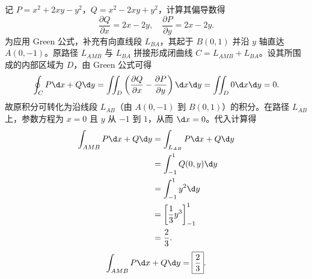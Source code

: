 \begin{solution}

    记 $P = x^2+2xy-y^2$，$Q = x^2-2xy+y^2$，计算其偏导数得
    \begin{equation}
        \frac{\partial Q}{\partial x} = 2x-2y, \quad \frac{\partial P}{\partial y} = 2x-2y.
    \end{equation}
    为应用 Green 公式，补充有向直线段 $L_{BA}$，其起于 $B(0,1)$ 并沿 $y$ 轴直达 $A(0,-1)$。原路径 $L_{AMB}$ 与 $L_{BA}$ 拼接形成闭曲线 $C = L_{AMB} + L_{BA}$。设其所围成的内部区域为 $D$，由 Green 公式可得
    \begin{equation}
        \oint_C P \d x + Q \d y = \iint_D \left( \frac{\partial Q}{\partial x} - \frac{\partial P}{\partial y} \right) \d x \d y = \iint_D 0 \d x \d y = 0.
    \end{equation}
    故原积分可转化为沿线段 $L_{AB}$（由 $A(0,-1)$ 到 $B(0,1)$）的积分。在路径 $L_{AB}$ 上，参数方程为 $x=0$ 且 $y$ 从 $-1$ 到 $1$，从而 $\d x = 0$。代入计算得
    \begin{equation}
        \begin{aligned}
            \int_{AMB} P \d x + Q \d y & = \int_{L_{AB}} P \d x + Q \d y        \\
                                       & = \int_{-1}^1 Q(0,y) \d y              \\
                                       & = \int_{-1}^1 y^2 \d y                 \\
                                       & = \left[ \frac{1}{3}y^3 \right]_{-1}^1 \\
                                       & = \frac{2}{3}.
        \end{aligned}
    \end{equation}
    \begin{equation}
        \int_{AMB} P \d x + Q \d y = \boxed{\frac{2}{3}}.
    \end{equation}



\end{solution}
